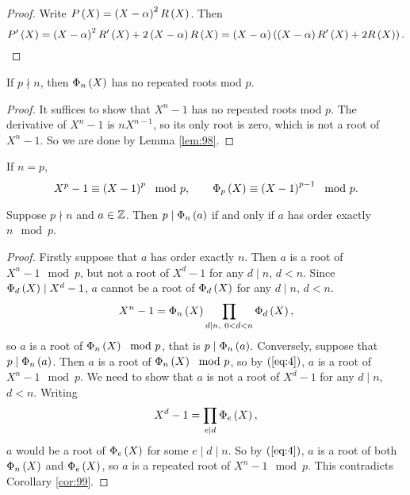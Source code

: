 \begin{proof}
Write $ P\left( X \right) = \left( X - \alpha \right)^2R\left( X \right) $. Then
$$ P'\left( X \right) = \left( X - \alpha \right)^2R'\left( X \right) + 2\left( X - \alpha \right)R\left( X \right) = \left( X - \alpha \right)\left( \left( X - \alpha \right)R'\left( X \right) + 2R\left( X \right) \right). $$
\end{proof}

\begin{corollary}
\label{cor:99}
If $ p \nmid n $, then $ \Phi_n\left( X \right) $ has no repeated roots mod $ p $.
\end{corollary}

\begin{proof}
It suffices to show that $ X^n - 1 $ has no repeated roots mod $ p $. The derivative of $ X^n - 1 $ is $ nX^{n - 1} $, so its only root is zero, which is not a root of $ X^n - 1 $. So we are done by Lemma \ref{lem:98}.
\end{proof}

\begin{note*}
If $ n = p $,
$$ X^p - 1 \equiv \left( X - 1 \right)^p \mod p, \qquad \Phi_p\left( X \right) \equiv \left( X - 1 \right)^{p - 1} \mod p. $$
\end{note*}

\begin{theorem}
\label{thm:100}
Suppose $ p \nmid n $ and $ a \in \mathbb{Z} $. Then $ p \mid \Phi_n\left( a \right) $ if and only if $ a $ has order exactly $ n \mod p $.
\end{theorem}

\begin{proof}
Firstly suppose that $ a $ has order exactly $ n $. Then $ a $ is a root of $ X^n - 1 \mod p $, but not a root of $ X^d - 1 $ for any $ d \mid n $, $ d < n $. Since $ \Phi_d\left( X \right) \mid X^d - 1 $, $ a $ cannot be a root of $ \Phi_d\left( X \right) $ for any $ d \mid n $, $ d < n $.
\begin{equation}
\label{eq:4}
X^n - 1 = \Phi_n\left( X \right)\prod_{d \mid n, \ 0 < d < n} \Phi_d\left( X \right),
\end{equation}
so $ a $ is a root of $ \Phi_n\left( X \right) \mod p $, that is $ p \mid \Phi_n\left( a \right) $. Conversely, suppose that $ p \mid \Phi_n\left( a \right) $. Then $ a $ is a root of $ \Phi_n\left( X \right) \mod p $, so by $ \left( \ref{eq:4} \right) $, $ a $ is a root of $ X^n - 1 \mod p $. We need to show that $ a $ is not a root of $ X^d - 1 $ for any $ d \mid n $, $ d < n $. Writing
$$ X^d - 1 = \prod_{e \mid d} \Phi_e\left( X \right), $$
$ a $ would be a root of $ \Phi_e\left( X \right) $ for some $ e \mid d \mid n $. So by $ \left( \ref{eq:4} \right) $, $ a $ is a root of both $ \Phi_n\left( X \right) $ and $ \Phi_e\left( X \right) $, so $ a $ is a repeated root of $ X^n - 1 \mod p $. This contradicts Corollary \ref{cor:99}.
\end{proof}

